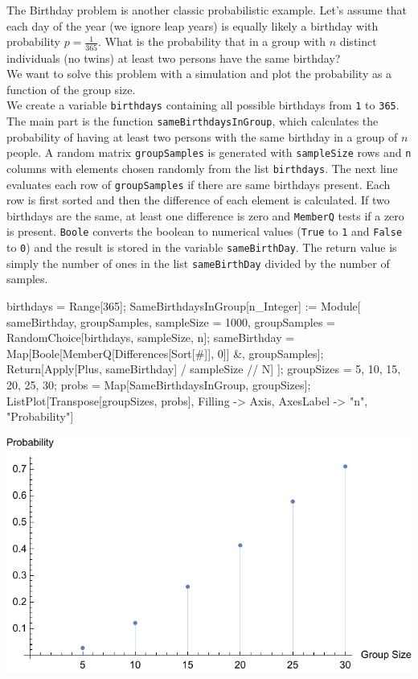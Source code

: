 \documentclass{tstextbook}
\begin{document}
\begin{example}
The Birthday problem is another classic probabilistic example. Let's assume that each day of the year (we ignore leap years) is equally likely a birthday with probability $p=\frac{1}{365}$. What is the probability that in a group with $n$ distinct individuals (no twins) at least two persons have the same birthday?\\

We want to solve this problem with a simulation and plot the probability as a function of the group size. \\

We create a variable \texttt{birthdays} containing all possible birthdays from \texttt{1} to \texttt{365}.
The main part is the function \texttt{sameBirthdaysInGroup}, which calculates the probability of having at least two persons with the same birthday in a group of $n$ people. A random matrix \texttt{groupSamples} is generated with \texttt{sampleSize} rows and \texttt{n} columns with elements chosen randomly from the list \texttt{birthdays}. The next line evaluates each row of \texttt{groupSamples} if there are same birthdays present. Each row is first sorted and then the difference of each element is calculated. If two birthdays are the same, at least one difference is zero and
\texttt{MemberQ} tests if a zero is present. \texttt{Boole} converts the boolean to numerical values (\texttt{True} to \texttt{1} and \texttt{False} to \texttt{0}) and the result is stored in the variable \texttt{sameBirthDay}. The return value is simply the number of ones in the list \texttt{sameBirthDay} divided by the number of samples.\\ 

\begin{mathematica}
birthdays = Range[365];
SameBirthdaysInGroup[n_Integer] := Module[
   {sameBirthday, groupSamples, sampleSize = 1000},
   groupSamples = RandomChoice[birthdays, {sampleSize, n}];
   sameBirthday = Map[Boole[MemberQ[Differences[Sort[#]], 0]] &, groupSamples];
   Return[Apply[Plus, sameBirthday] / sampleSize // N]
   ];
groupSizes = {5, 10, 15, 20, 25, 30};
probs = Map[SameBirthdaysInGroup, groupSizes];
ListPlot[Transpose[{groupSizes, probs}],
         Filling -> Axis, 
         AxesLabel -> {"n", "Probability"}]
\end{mathematica}

 \includegraphics[scale=1, center]{images/double_birthday_problem.pdf}
 

\end{example}
\end{document}
